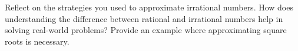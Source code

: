 \documentclass[12pt]{article}
\begin{document}
\vspace{1em}

\begin{tcolorbox}[colframe=black!60, colback=white, 
coltitle=black, colbacktitle=black!15, fonttitle=\bfseries\Large, 
title=Reflection, halign title=center, left=10pt, right=10pt, top=10pt, bottom=100pt]
Reflect on the strategies you used to approximate irrational numbers. How does understanding the difference between rational and irrational numbers help in solving real-world problems? Provide an example where approximating square roots is necessary.
\end{tcolorbox}
\end{document}
